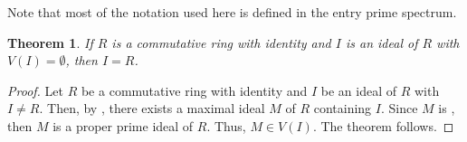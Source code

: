 \documentclass[12pt]{article}
\newtheorem*{thm*}{Theorem}
\begin{document}
Note that most of the notation used here is defined in the entry prime spectrum.

\begin{thm*}
If $R$ is a commutative ring with identity and $I$ is an ideal of $R$ with $V(I)=\emptyset$, then $I=R$.
\end{thm*}

\begin{proof}
Let $R$ be a commutative ring with identity and $I$ be an ideal of $R$ with $I \neq R$.  Then, by , there exists a maximal ideal $M$ of $R$ containing $I$.  Since $M$ is , then $M$ is a proper prime ideal of $R$.  Thus, $M \in V(I)$.  The theorem follows.
\end{proof}
\end{document}

